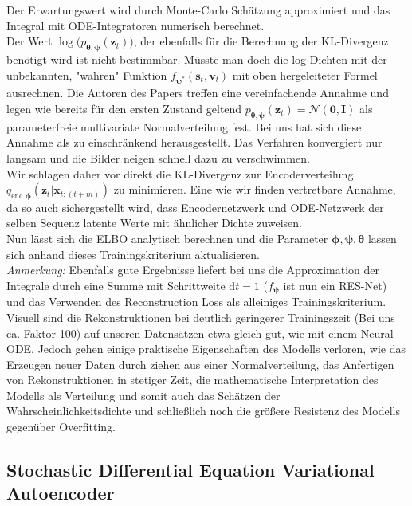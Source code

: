 \documentclass[12pt]{article}
\begin{document}
	Der Erwartungswert wird durch Monte-Carlo Schätzung approximiert und das Integral mit ODE-Integratoren numerisch berechnet.\\
	Der Wert
	$\log\big(p_{\boldsymbol\theta,\boldsymbol\psi}(\mathbf{z}_{t}) \big)$, der ebenfalls für die Berechnung der KL-Divergenz benötigt wird ist nicht bestimmbar. Müsste man doch die log-Dichten mit der unbekannten, "wahren" Funktion $f_{\boldsymbol\psi^{*}}(\mathbf{s}_{t},\mathbf{v}_{t})$ mit oben hergeleiteter Formel ausrechnen.
	Die Autoren des Papers treffen eine vereinfachende Annahme und legen wie bereits für den ersten Zustand geltend $p_{\boldsymbol\theta,\boldsymbol\psi}(\mathbf{z}_{t}) = \mathcal{N}(\mathbf{0},\mathbf{I})$ als parameterfreie multivariate Normalverteilung fest.
	Bei uns hat sich diese Annahme als zu einschränkend herausgestellt. Das Verfahren konvergiert nur langsam und die Bilder neigen schnell dazu zu verschwimmen. \\
	Wir schlagen daher vor direkt die KL-Divergenz zur Encoderverteilung $q_{\text{enc }\boldsymbol\phi}(\mathbf{z}_{t}|\mathbf{x}_{t:(t+m)})$ zu minimieren. Eine wie wir finden vertretbare Annahme, da so auch sichergestellt wird, dass Encodernetzwerk und ODE-Netzwerk der selben Sequenz latente Werte mit ähnlicher Dichte zuweisen.\\
	Nun lässt sich die ELBO analytisch berechnen und die Parameter $\boldsymbol\phi,\boldsymbol\psi,\boldsymbol\theta$ lassen sich anhand dieses Trainingskriterium aktualisieren.\\

	\emph{Anmerkung:} Ebenfalls gute Ergebnisse liefert bei uns die Approximation der Integrale durch eine Summe mit Schrittweite $\mathrm{d}t=1$ ($f_{\boldsymbol\psi}$ ist nun ein RES-Net) und das Verwenden des Reconstruction Loss als alleiniges Trainingskriterium. Visuell sind die Rekonstruktionen bei deutlich geringerer Trainingszeit (Bei uns ca. Faktor 100) auf unseren Datensätzen etwa gleich gut, wie mit einem Neural-ODE. Jedoch gehen einige praktische Eigenschaften des Modells verloren, wie das Erzeugen neuer Daten durch ziehen aus einer Normalverteilung, das Anfertigen von Rekonstruktionen in stetiger Zeit, die mathematische Interpretation des Modells als Verteilung und somit auch das Schätzen der Wahrscheinlichkeitsdichte und schließlich noch die größere Resistenz des Modells gegenüber Overfitting.


	\subsection[SDE-VAE]{Stochastic Differential Equation Variational Autoencoder}
\end{document}
